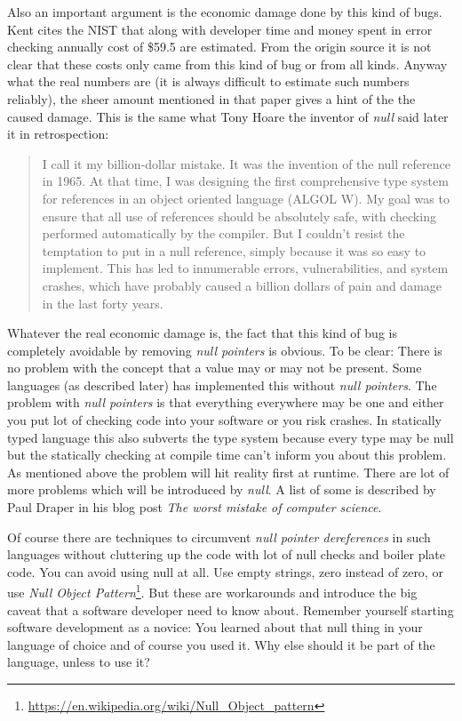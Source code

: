 \documentclass[11pt, a4paper]{report}
\begin{document}
Also an important argument is the economic damage done by this kind of bugs. Kent\cite{kent-dyn-err-remediation} cites the NIST that along with developer time and money spent in error checking annually cost of \$59.5 are estimated. From the origin source it is not clear that these costs only came from this kind of bug or from all kinds. Anyway what the real numbers are (it is always difficult to estimate such numbers reliably), the sheer amount mentioned in that paper gives a hint of the the caused damage. This is the same what Tony Hoare\cite{hoare-wiki} the inventor of \textit{null} said later it\cite{hoeare-null} in retrospection:

\begin{quotation}
    I call it my billion-dollar mistake. It was the invention of the null reference in 1965. At that time, I was designing the first comprehensive type system for references in an object oriented language (ALGOL W). My goal was to ensure that all use of references should be absolutely safe, with checking performed automatically by the compiler. But I couldn't resist the temptation to put in a null reference, simply because it was so easy to implement. This has led to innumerable errors, vulnerabilities, and system crashes, which have probably caused a billion dollars of pain and damage in the last forty years.	
\end{quotation} 

Whatever the real economic damage is, the fact that this kind of bug is completely avoidable by removing \textit{null pointers} is obvious. To be clear: There is no problem with the concept that a value may or may not be present. Some languages (as described later) has implemented this without \textit{null pointers}. The problem with \textit{null pointers} is that everything everywhere may be one and either you put lot of checking code into your software or you risk crashes. In statically typed language this also subverts the type system because every type may be null but the statically checking at compile time can't inform you about this problem. As mentioned above the problem will hit reality first at runtime. There are lot of more problems which will be introduced by \textit{null}. A list of some is described by Paul Draper in his blog post \textit{The worst mistake of computer science}\cite{draper-worst-mistake-cs}.

Of course there are techniques to circumvent \textit{null pointer dereferences} in such languages without cluttering up the code with lot of null checks and boiler plate code. You can avoid using null at all. Use empty strings, zero instead of zero, or use \textit{Null Object Pattern}\footnote{\url{https://en.wikipedia.org/wiki/Null_Object_pattern}}. But these are workarounds and introduce the big caveat that a software developer need to know about. Remember yourself starting software development as a novice: You learned about that null thing in your language of choice and of course you used it. Why else should it be part of the language, unless to use it?
\end{document}
